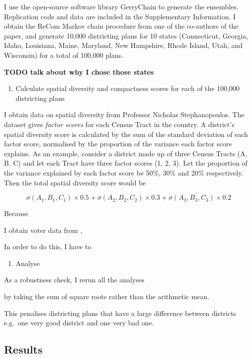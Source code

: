 \documentclass[]{article}
\providecommand{\tightlist}{%
  \setlength{\itemsep}{0pt}\setlength{\parskip}{0pt}}
\begin{document}
I use the open-source software library GerryChain to generate the
ensembles. Replication code and data are included in the Supplementary
Information. I obtain the ReCom Markov chain procedure from one of the
co-authors of the \cite{ddj2019recom} paper, and generate 10,000
districting plans for 10 states (Connecticut, Georgia, Idaho, Louisiana,
Maine, Maryland, New Hampshire, Rhode Island, Utah, and Wisconsin) for a
total of 100,000 plans.

\textbf{TODO talk about why I chose those states}

\begin{enumerate}
\def\labelenumi{\arabic{enumi}.}
\setcounter{enumi}{1}
\tightlist
\item
  Calculate spatial diversity and compactness scores for each of the
  100,000 districting plans
\end{enumerate}

I obtain data on spatial diversity from Professor Nicholas
Stephanopoulos. The dataset gives \emph{factor scores} for each Census
Tract in the country. A district's spatial diversity score is calculated
by the sum of the standard deviation of each factor score, normalised by
the proportion of the variance each factor score explains. As an
example, consider a district made up of three Census Tracts (A, B, C)
and let each Tract have three factor scores (1, 2, 3). Let the
proportion of the variance explained by each factor score be 50\%, 30\%
and 20\% respectively. Then the total spatial diversity score would be

\[ \sigma(A_1, B_1, C_1) \times 0.5 + \sigma(A_2, B_2, C_2) \times 0.3 + \sigma(A_3,
B_3, C_3) \times 0.2\]

Because

I obtain voter data from \citeauthor{er2019},

In order to do this, I have to

\begin{enumerate}
\def\labelenumi{\arabic{enumi}.}
\setcounter{enumi}{2}
\tightlist
\item
  Analyse
\end{enumerate}

As a robustness check, I rerun all the analyses

by taking the sum of square roots rather than the arithmetic mean.

This penalises districting plans that have a large difference between
districts e.g.~one very good district and one very bad one.

\hypertarget{results}{%
\subsection{Results}\label{results}}
\end{document}
